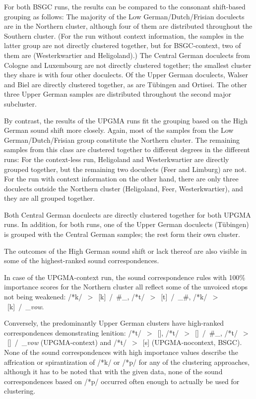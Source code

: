 \documentclass[a4paper]{article}
\begin{document}
For both BSGC runs, the results can be compared to the consonant shift-based grouping as follows:
The majority of the Low German/Dutch/Frisian doculects are in
the Northern cluster,
although four of them are distributed throughout the Southern cluster.
(For the run without context information,
the samples in the latter group are not directly clustered together,
but for BSGC-context,
two of them are (Westerkwartier and Heligoland).)
The Central German doculects from Cologne and Luxembourg
are not directly clustered together; the smallest cluster they share
is with four other doculects.
Of the Upper German doculects,
Walser and Biel are directly clustered together,
as are T\"{u}bingen and Ortisei.
The other three Upper German samples are distributed throughout
the second major subcluster.

By contrast, the results of the UPGMA runs fit
the grouping based on the High German sound shift more closely.
Again, most of the samples from the Low German/Dutch/Frisian group
constitute the Northern cluster.
The remaining samples from this class are clustered together
to different degrees in the different runs:
For the context-less run,
Heligoland and Westerkwartier are directly grouped together,
but the remaining two doculects (Feer and Limburg) are not.
For the run with context information on the other hand,
there are only three doculects outside the Northern cluster
(Heligoland, Feer, Westerkwartier),
and they are all grouped together.

Both Central German doculects are directly clustered together
for both UPGMA runs. In addition, for both runs, one of the
Upper German doculects (T\"{u}bingen) is grouped with the
Central German samples; the rest form their own cluster.

The outcomes of the High German sound shift or lack thereof
are also visible in some of the highest-ranked sound correspondences.

In case of the UPGMA-context run,
the sound correspondence rules with 100\% importance scores
for the Northern cluster
all reflect some of the unvoiced stops not being weakened:
/*k/~$>$~[k]~/~\#\_, /*t/~$>$~[t]~/~\_\#, /*k/~$>$~[k]~/~\_\textit{vow}.

Conversely, the predominantly Upper German clusters
have high-ranked correspondences demonstrating lenition:
/*t/~$>$~[], /*t/~$>$~[]~/~\#\_,
/*t/~$>$~[]~/~\_\textit{vow} (UPGMA-context)
and /*t/~$>$~[s] (UPGMA-nocontext, BSGC).
None of the sound correspondences with high importance values
describe the affrication or spirantization of /*k/ or /*p/
for any of the clustering approaches,
although it has to be noted that with the given data,
none of the sound correspondences based on /*p/
occurred often enough to actually be used for clustering.
\end{document}
